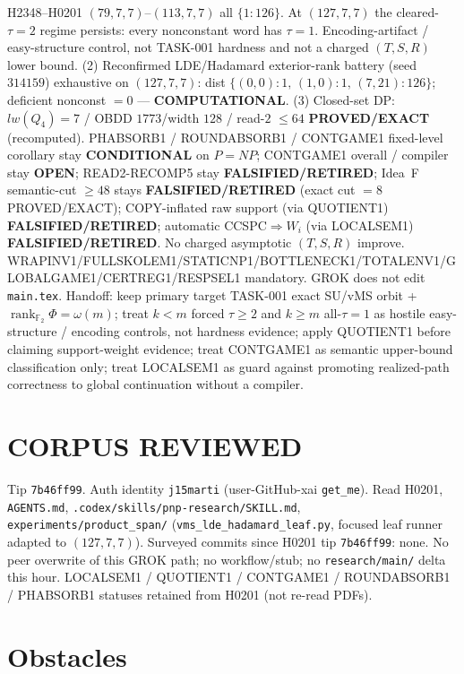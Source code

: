 \documentclass[11pt]{article}
\begin{document}
H2348--H0201 $(79,7,7)$--$(113,7,7)$ all $\{1{:}126\}$.
At $(127,7,7)$ the cleared-$\tau{=}2$ regime persists:
every nonconstant word has $\tau{=}1$. Encoding-artifact / easy-structure control,
not TASK-001 hardness and not a charged $(T,S,R)$ lower bound.
(2) Reconfirmed LDE/Hadamard exterior-rank battery (seed~$314159$) exhaustive on
$(127,7,7)$: dist $\{(0,0){:}1,\,(1,0){:}1,\,(7,21){:}126\}$; deficient nonconst $=0$ ---
\textbf{COMPUTATIONAL}.
(3) Closed-set DP: $lw(Q_4)=7$ / OBDD $1773$/width $128$ / read-$2$ $\le64$
\textbf{PROVED/EXACT} (recomputed).
PHABSORB1 / ROUNDABSORB1 / CONTGAME1 fixed-level corollary stay \textbf{CONDITIONAL} on $P=NP$;
CONTGAME1 overall / compiler stay \textbf{OPEN}; READ2-RECOMP5 stay \textbf{FALSIFIED/RETIRED};
Idea~F semantic-cut $\ge48$ stays \textbf{FALSIFIED/RETIRED} (exact cut $=8$ PROVED/EXACT);
COPY-inflated raw support (via QUOTIENT1) \textbf{FALSIFIED/RETIRED};
automatic CCSPC$\Rightarrow W_i$ (via LOCALSEM1) \textbf{FALSIFIED/RETIRED}.
No charged asymptotic $(T,S,R)$ improve.
WRAPINV1/FULLSKOLEM1/STATICNP1/BOTTLENECK1/TOTALENV1/GLOBALGAME1/CERTREG1/RESPSEL1 mandatory.
GROK does not edit \texttt{main.tex}.
Handoff: keep primary target TASK-001 exact SU/vMS orbit + $\operatorname{rank}_{\mathbb F_2}\Phi=\omega(m)$;
treat $k{<}m$ forced $\tau{\ge}2$ and $k{\ge}m$ all-$\tau{=}1$ as hostile easy-structure /
encoding controls, not hardness evidence; apply QUOTIENT1 before claiming support-weight
evidence; treat CONTGAME1 as semantic upper-bound classification only; treat LOCALSEM1 as
guard against promoting realized-path correctness to global continuation without a compiler.

\section*{CORPUS REVIEWED}
Tip \texttt{7b46ff99}. Auth identity \texttt{j15marti} (user-GitHub-xai \texttt{get\_me}).
Read H0201, \texttt{AGENTS.md}, \texttt{.codex/skills/pnp-research/SKILL.md},
\texttt{experiments/product\_span/}
(\texttt{vms\_lde\_hadamard\_leaf.py}, focused leaf runner adapted to $(127,7,7)$).
Surveyed commits since H0201 tip \texttt{7b46ff99}: none.
No peer overwrite of this GROK path; no workflow/stub; no \texttt{research/main/} delta this hour.
LOCALSEM1 / QUOTIENT1 / CONTGAME1 / ROUNDABSORB1 / PHABSORB1 statuses retained from H0201 (not re-read PDFs).

\section*{Obstacles}
\end{document}
